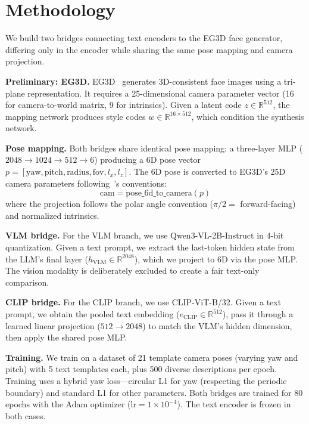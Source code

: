 \section{Methodology}
\label{sec:method}

We build two bridges connecting text encoders to the EG3D face generator, differing only in the encoder while sharing the same pose mapping and camera projection.

\textbf{Preliminary: EG3D.} EG3D~\cite{EG3D} generates 3D-consistent face images using a tri-plane representation. It requires a 25-dimensional camera parameter vector (16 for camera-to-world matrix, 9 for intrinsics). Given a latent code $z \in \mathbb{R}^{512}$, the mapping network produces style codes $w \in \mathbb{R}^{16 \times 512}$, which condition the synthesis network.

\textbf{Pose mapping.} Both bridges share identical pose mapping: a three-layer MLP ($2048 \to 1024 \to 512 \to 6$) producing a 6D pose vector $p = [\text{yaw}, \text{pitch}, \text{radius}, \text{fov}, l_x, l_z]$. The 6D pose is converted to EG3D's 25D camera parameters following~\cite{EG3D}'s conventions:
\begin{equation}
\text{cam} = \text{pose\_6d\_to\_camera}(p)
\end{equation}
where the projection follows the polar angle convention ($\pi/2 =$ forward-facing) and normalized intrinsics.

\textbf{VLM bridge.} For the VLM branch, we use Qwen3-VL-2B-Instruct in 4-bit quantization. Given a text prompt, we extract the last-token hidden state from the LLM's final layer ($h_{\text{VLM}} \in \mathbb{R}^{2048}$), which we project to 6D via the pose MLP. The vision modality is deliberately excluded to create a fair text-only comparison.

\textbf{CLIP bridge.} For the CLIP branch, we use CLIP-ViT-B/32. Given a text prompt, we obtain the pooled text embedding ($e_{\text{CLIP}} \in \mathbb{R}^{512}$), pass it through a learned linear projection ($512 \to 2048$) to match the VLM's hidden dimension, then apply the shared pose MLP.

\textbf{Training.} We train on a dataset of 21 template camera poses (varying yaw and pitch) with 5 text templates each, plus 500 diverse descriptions per epoch. Training uses a hybrid yaw loss---circular L1 for yaw (respecting the periodic boundary) and standard L1 for other parameters. Both bridges are trained for 80 epochs with the Adam optimizer ($\text{lr}=1\times10^{-4}$). The text encoder is frozen in both cases.
